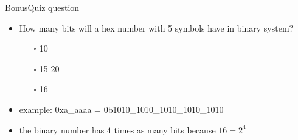 \begin{frame}{Bonus}{Quiz question}
  \begin{itemize}
    \item How many bits will a hex number with 5 symbols have in binary system?
      \begin{itemize}
        \item[$\square$] 10
        \item[$\square$] 15
         20
        \item[$\square$] 16
      \end{itemize}
    \item<2>\alert{example:} 0xa\_aaaa = 0b1010\_1010\_1010\_1010\_1010
    \item<2>the \alert{binary number} has $4$ times as many bits because $16=2^4$
  \end{itemize}
\end{frame}
